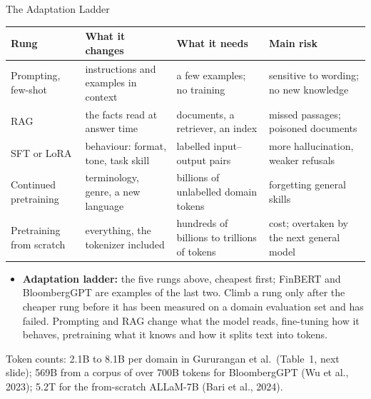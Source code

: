 \begin{frame}{The Adaptation Ladder}

  {\centering\scriptsize
  \begin{tabular}{>{\raggedright\arraybackslash}p{2.4cm} >{\raggedright\arraybackslash}p{3.0cm} >{\raggedright\arraybackslash}p{3.0cm} >{\raggedright\arraybackslash}p{3.6cm}}
    \toprule
    \textbf{Rung} & \textbf{What it changes} & \textbf{What it needs} & \textbf{Main risk} \\
    \midrule
    Prompting, few-shot & instructions and examples in context & a few examples; no training & sensitive to wording; no new knowledge \\
    \addlinespace[0.15em]
    RAG & the facts read at answer time & documents, a retriever, an index & missed passages; poisoned documents \\
    \addlinespace[0.15em]
    SFT or LoRA & behaviour: format, tone, task skill & labelled input--output pairs & more hallucination, weaker refusals \\
    \addlinespace[0.15em]
    Continued pretraining & terminology, genre, a new language & billions of unlabelled domain tokens & forgetting general skills \\
    \addlinespace[0.15em]
    Pretraining from scratch & everything, the tokenizer included & hundreds of billions to trillions of tokens & cost; overtaken by the next general model \\
    \bottomrule
  \end{tabular}\par}
  \vspace{0.5em}
  \begin{itemize}\footnotesize\itemsep0.3em
    \item[\textcolor{red}{$\blacktriangleright$}] \textbf{Adaptation ladder:} the five rungs above, cheapest first; FinBERT and BloombergGPT are examples of the last two. Climb a rung only after the cheaper rung before it has been measured on a domain evaluation set and has failed. Prompting and RAG change what the model reads, fine-tuning how it behaves, pretraining what it knows and how it splits text into tokens.
  \end{itemize}
  \vspace{0.1em}
  {\scriptsize Token counts: 2.1B to 8.1B per domain in Gururangan et al.\ (Table~1, next slide); 569B from a corpus of over 700B tokens for BloombergGPT (Wu et al., 2023); 5.2T for the from-scratch ALLaM-7B (Bari et al., 2024).}
\end{frame}

